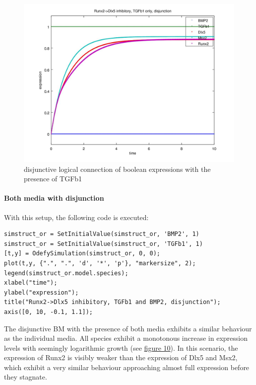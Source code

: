 \documentclass[11pt]{article}
\begin{document}
\begin{figure}[!htb]
	\centering
	\includegraphics[scale=0.55]{case5.jpg}
	\caption{\label{fifthCase} disjunctive logical connection of boolean expressions with the presence of TGFb1}
\end{figure}

\paragraph{Both media with disjunction}
With this setup, the following code is executed:
\begin{lstlisting}
simstruct_or = SetInitialValue(simstruct_or, 'BMP2', 1)
simstruct_or = SetInitialValue(simstruct_or, 'TGFb1', 1)
[t,y] = OdefySimulation(simstruct_or, 0, 0);
plot(t,y, {".", ".", 'd', '*', 'p'}, "markersize", 2);
legend(simstruct_or.model.species);
xlabel("time");
ylabel("expression");
title("Runx2->Dlx5 inhibitory, TGFb1 and BMP2, disjunction");
axis([0, 10, -0.1, 1.1]);
\end{lstlisting}
The disjunctive BM with the presence of both media exhibits a similar behaviour as the individual media. All species exhibit a monotonous increase in expression levels with seemingly logarithmic growth (see \hyperref[sixthCase]{figure 10}). In this scenario, the expression of Runx2 is visibly weaker than the expression of Dlx5 and Msx2, which exhibit a very similar behaviour approaching almost full expression before they stagnate.
\end{document}
